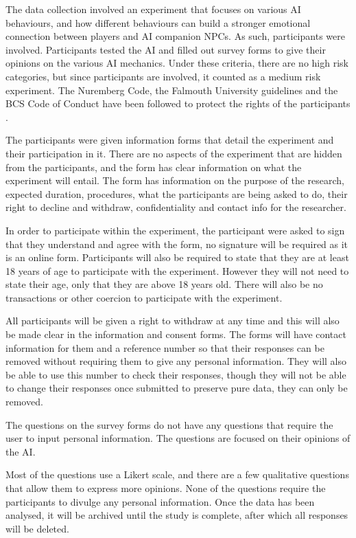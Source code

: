 \documentclass{IEEEtran}
\begin{document}
The data collection involved an experiment that focuses on various AI behaviours, and how different behaviours can build a stronger emotional connection between players and AI companion NPCs. As such, participants were involved. Participants tested the AI and filled out survey forms to give their opinions on the various AI mechanics. Under these criteria, there are no high risk categories, but since participants are involved, it counted as a medium risk experiment. The Nuremberg Code, the Falmouth University guidelines and the BCS Code of Conduct have been followed to protect the rights of the participants \cite{germany1949trials, BCSConductCode}.

The participants were given information forms that detail the experiment and their participation in it. There are no aspects of the experiment that are hidden from the participants, and the form has clear information on what the experiment will entail. The form has information on the purpose of the research, expected duration, procedures, what the participants are being asked to do, their right to decline and withdraw, confidentiality and contact info for the researcher.

In order to participate within the experiment, the participant were asked to sign that they understand and agree with the form, no signature will be required as it is an online form. Participants will also be required to state that they are at least 18 years of age to participate with the experiment. However they will not need to state their age, only that they are above 18 years old. There will also be no transactions or other coercion to participate with the experiment.

All participants will be given a right to withdraw at any time and this will also be made clear in the information and consent forms. The forms will have contact information for them and a reference number so that their responses can be removed without requiring them to give any personal information. They will also be able to use this number to check their responses, though they will not be able to change their responses once submitted to preserve pure data, they can only be removed.

The questions on the survey forms do not have any questions that require the user to input personal information. The questions are focused on their opinions of the AI.

Most of the questions use a Likert scale, and there are a few qualitative questions that allow them to express more opinions. None of the questions require the participants to divulge any personal information. Once the data has been analysed, it will be archived until the study is complete, after which all responses will be deleted.
\end{document}
